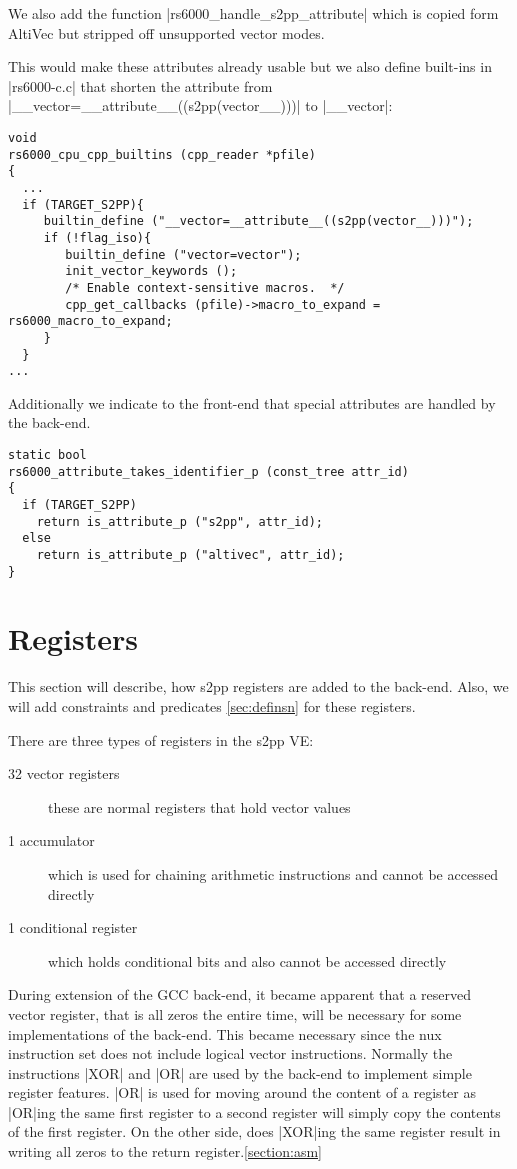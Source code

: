 We also add the function |rs6000_handle_s2pp_attribute| which is copied form AltiVec but stripped off unsupported vector modes.

This would make these attributes already usable but we also define built-ins in |rs6000-c.c| that shorten the attribute from |__vector=__attribute__((s2pp(vector__)))| to |__vector|:
\begin{lstlisting}
void
rs6000_cpu_cpp_builtins (cpp_reader *pfile)
{
  ...
  if (TARGET_S2PP){
     builtin_define ("__vector=__attribute__((s2pp(vector__)))");
     if (!flag_iso){
        builtin_define ("vector=vector");
        init_vector_keywords ();
        /* Enable context-sensitive macros.  */
        cpp_get_callbacks (pfile)->macro_to_expand = rs6000_macro_to_expand;
     }
  }
... 
\end{lstlisting}

Additionally we indicate to the front-end that special attributes are handled by the back-end.
\begin{lstlisting}
static bool
rs6000_attribute_takes_identifier_p (const_tree attr_id)
{
  if (TARGET_S2PP)
    return is_attribute_p ("s2pp", attr_id);
  else
    return is_attribute_p ("altivec", attr_id);
}
\end{lstlisting}

\section{Registers}
\label{section:register}
This section will describe, how s2pp registers are added to the back-end.
Also, we will add constraints and predicates \ref{sec:definsn} for these registers.

There are three types of registers in the s2pp VE:
\begin{description}
    \item[32 vector registers] these are normal registers that hold vector values
    \item[1 accumulator] which is used for chaining arithmetic instructions and cannot be accessed directly
    \item[1 conditional register] which holds conditional bits and also cannot be accessed directly
\end{description}

During extension of the GCC back-end, it became apparent that a reserved vector register, that is all zeros the entire time, will be necessary for some implementations of the back-end.
This became necessary since the nux instruction set does not include logical vector instructions.
Normally the instructions |XOR| and |OR| are used by the back-end to implement simple register features.
|OR| is used for moving around the content of a register as |OR|ing the same first register to a second register will simply copy the contents of the first register.
On the other side, does |XOR|ing the same register result in writing all zeros to the return register.\ref{section:asm}

